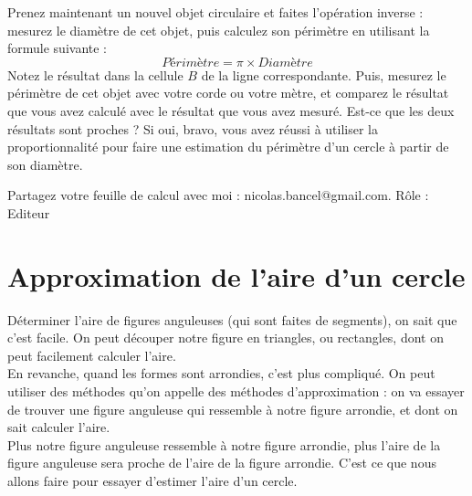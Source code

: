 \documentclass{exam}
\begin{document}
\begin{questions}
\question Prenez maintenant un nouvel objet circulaire et faites l'opération inverse : mesurez le diamètre de cet objet, puis calculez son périmètre en utilisant la formule suivante :
\[
Périmètre = \pi \times Diamètre
\]
Notez le résultat dans la cellule $B$ de la ligne correspondante. Puis, mesurez le périmètre de cet objet avec votre corde ou votre mètre, et comparez le résultat que vous avez calculé avec le résultat que vous avez mesuré. Est-ce que les deux résultats sont proches ? Si oui, bravo, vous avez réussi à utiliser la proportionnalité pour faire une estimation du périmètre d'un cercle à partir de son diamètre.

\question Partagez votre feuille de calcul avec moi : nicolas.bancel@gmail.com. Rôle : Editeur

\end{questions}

\section{Approximation de l'aire d'un cercle}

\begin{Indication}
Déterminer l'aire de figures anguleuses (qui sont faites de segments), on sait que c'est facile. On peut découper notre figure en triangles, ou rectangles, dont on peut facilement calculer l'aire. \\

En revanche, quand les formes sont arrondies, c'est plus compliqué. On peut utiliser des méthodes qu'on appelle des méthodes d'approximation : on va essayer de trouver une figure anguleuse qui ressemble à notre figure arrondie, et dont on sait calculer l'aire. \\

Plus notre figure anguleuse ressemble à notre figure arrondie, plus l'aire de la figure anguleuse sera proche de l'aire de la figure arrondie. C'est ce que nous allons faire pour essayer d'estimer l'aire d'un cercle.
\end{Indication}
\end{document}
